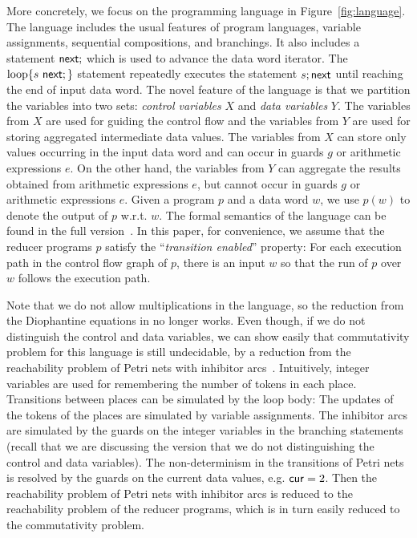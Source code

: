 More concretely, we focus on the programming language in Figure~\ref{fig:language}. The language includes the usual features of program languages, variable assignments, sequential compositions, and branchings. It also includes a statement $\mathsf{next};$ which is used to advance the data word iterator. The $\loopL{s\ \nnext;}$ statement repeatedly executes the statement $s;\mathsf{next}$ until reaching the end of input data word.
The novel feature of the language is that we partition the variables into two sets: \emph{control variables} $X$ and \emph{data variables} $Y$.
The variables from $X$ are used for guiding the control flow and the variables from $Y$ are used for storing aggregated intermediate data values.
The variables from $X$ can store only values occurring in the input data word and can occur in guards $g$ or arithmetic expressions $e$.
On the other hand, the variables from $Y$ can aggregate the results obtained from arithmetic expressions $e$, but cannot occur in guards $g$ or arithmetic expressions $e$.
Given a program $p$ and a data word $w$, we use $p(w)$ to denote the output of $p$ w.r.t. $w$. The formal semantics of the language can be found in the full version~\cite{full-version}. In this paper, for convenience, we assume that the reducer programs $p$ satisfy the ``\emph{transition enabled}'' property: For each execution path in the control flow graph of $p$, there is an input $w$ so that the run of $p$ over $w$ follows the execution path. 

Note that we do not allow multiplications in the language, so the reduction from the Diophantine equations in \cite{CHSW15} no longer works. Even though, if we do not distinguish the control and data variables, we can show easily that commutativity problem for this language is still undecidable, by a reduction from the reachability problem of Petri nets with inhibitor arcs~\cite{Min71,Rei08}.
Intuitively, integer variables are used for remembering the number of tokens in each place. Transitions between places can be simulated by the loop body: The updates of the tokens of the places are simulated by variable assignments.
The inhibitor arcs are simulated by the guards on the integer variables in the branching statements (recall that we are discussing the version that we do not distinguishing the control and data variables). The non-determinism in the transitions of Petri nets is resolved by the guards on the current data values, e.g. $\mathsf{cur} = 2$. 
Then the reachability problem of Petri nets with inhibitor arcs is reduced to the reachability problem of the reducer programs, which is in turn easily reduced to the commutativity problem.

